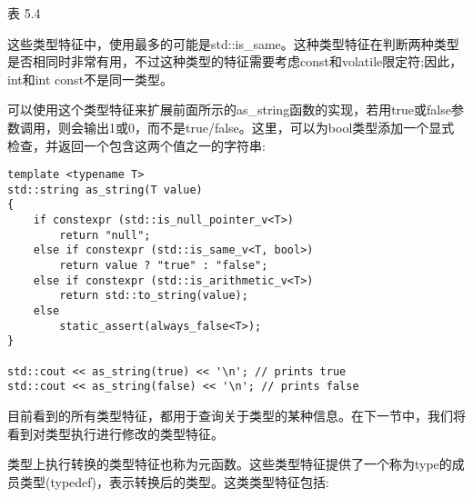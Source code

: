 \begin{center}
表 5.4
\end{center}

这些类型特征中，使用最多的可能是std::is\_same。这种类型特征在判断两种类型是否相同时非常有用，不过这种类型的特征需要考虑const和volatile限定符;因此，int和int const不是同一类型。

可以使用这个类型特征来扩展前面所示的as\_string函数的实现，若用true或false参数调用，则会输出1或0，而不是true/false。这里，可以为bool类型添加一个显式检查，并返回一个包含这两个值之一的字符串:

\begin{lstlisting}[style=styleCXX]
template <typename T>
std::string as_string(T value)
{
	if constexpr (std::is_null_pointer_v<T>)
		return "null";
	else if constexpr (std::is_same_v<T, bool>)
		return value ? "true" : "false";
	else if constexpr (std::is_arithmetic_v<T>)
		return std::to_string(value);
	else
		static_assert(always_false<T>);
}

std::cout << as_string(true) << '\n'; // prints true
std::cout << as_string(false) << '\n'; // prints false
\end{lstlisting}

目前看到的所有类型特征，都用于查询关于类型的某种信息。在下一节中，我们将看到对类型执行进行修改的类型特征。


类型上执行转换的类型特征也称为元函数。这些类型特征提供了一个称为type的成员类型(typedef)，表示转换后的类型。这类类型特征包括:

